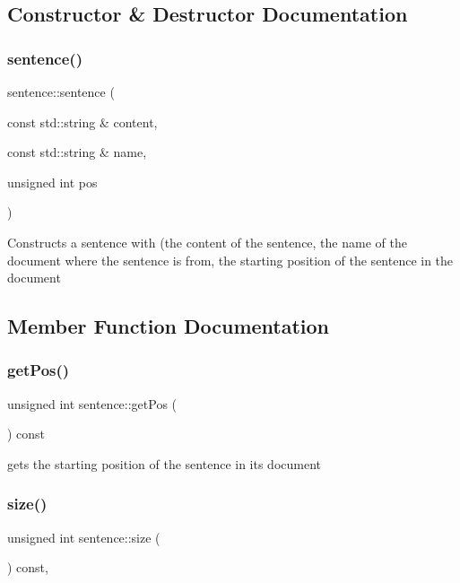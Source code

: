 \subsection{Constructor \& Destructor Documentation}
\mbox{\label{classsentence_af1d2a2e74a81d3a9d186f4076b89a4c7}} 
\subsubsection{\texorpdfstring{sentence()}{sentence()}}
{\footnotesize\ttfamily sentence\+::sentence (\begin{DoxyParamCaption}\item[{const std\+::string \&}]{content,  }\item[{const std\+::string \&}]{name,  }\item[{unsigned int}]{pos }\end{DoxyParamCaption})}

Constructs a sentence with (the content of the sentence, the name of the document where the sentence is from, the starting position of the sentence in the document 

\subsection{Member Function Documentation}
\mbox{\label{classsentence_a30b8697a186d696ba271e4c476528956}} 
\subsubsection{\texorpdfstring{get\+Pos()}{getPos()}}
{\footnotesize\ttfamily unsigned int sentence\+::get\+Pos (\begin{DoxyParamCaption}{ }\end{DoxyParamCaption}) const}

gets the starting position of the sentence in its document \mbox{\label{classsentence_afbe71af6de10ac098acaca7be2adf517}} 
\subsubsection{\texorpdfstring{size()}{size()}}
{\footnotesize\ttfamily unsigned int sentence\+::size (\begin{DoxyParamCaption}{ }\end{DoxyParamCaption}) const\hspace{0.3cm}{\ttfamily [override]}, {\ttfamily [virtual]}}

